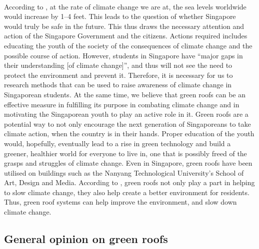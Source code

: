 \documentclass[a4paper]{article}
\begin{document}
\begin{multicols}{2}
  \paragraph{} According to \cite{nasa}, at the rate of climate
  change we are at, the sea levels worldwide would increase by 1--4
  feet. This leads to the question of whether Singapore would truly
  be safe in the future. This thus draws the necessary attention and
  action of the Singapore Government and the citizens. Actions required
  includes educating the youth of the society of the consequences of
  climate change and the possible course of action. However, students
  in Singapore have ``major gaps in their understanding [of climate
  change]''\parencite{student_carbon_footprint}, and thus will not
  see the need to protect the environment and prevent it. Therefore,
  it is necessary for us to research methods that can be used to raise
  awareness of climate change in Singaporean students. At the same
  time, we believe that green roofs can be an effective measure in
  fulfilling its purpose in combating climate change and in motivating
  the Singaporean youth to play an active role in it. Green roofs are a
  potential way to not only encourage the next generation of Singaporeans
  to take climate action,  when the country is in their hands. Proper
  education of the youth would, hopefully, eventually lead to a rise
  in green technology and build a greener, healthier world for everyone
  to live in, one that is possibly freed of the grasps and struggles of
  climate change. Even in Singapore, green roofs have been utilised on
  buildings such as the Nanyang Technological University's School of Art,
  Design and Media. According to \cite{greenbuild_advant1}, green roofs
  not only play a part in helping to slow climate change, they also help
  create a better environment for residents. Thus, green roof systems
  can help improve the environment, and slow down climate change.




  \subsection{General opinion on green roofs} \label{ssec:gropt}

\end{multicols}
\end{document}
